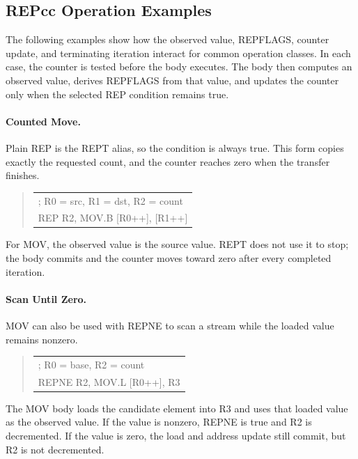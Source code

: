 \subsection{REPcc Operation Examples}
The following examples show how the observed value, REPFLAGS, counter update, and terminating iteration interact
for common operation classes. In each case, the counter is tested before the body executes. The body then
computes an observed value, derives REPFLAGS from that value, and updates the counter only when the selected REP
condition remains true.

\paragraph{Counted Move.}
Plain REP is the REPT alias, so the condition is always true. This form copies exactly the requested count, and
the counter reaches zero when the transfer finishes.

\begin{quote}
\begingroup\small\ttfamily
\begin{tabular}{@{}l@{}}
; R0 = src, R1 = dst, R2 = count\\
REP R2, MOV.B [R0++], [R1++]\\
\end{tabular}
\endgroup
\end{quote}

For MOV, the observed value is the source value. REPT does not use it to stop; the body commits and the counter
moves toward zero after every completed iteration.

\paragraph{Scan Until Zero.}
MOV can also be used with REPNE to scan a stream while the loaded value remains nonzero.

\begin{quote}
\begingroup\small\ttfamily
\begin{tabular}{@{}l@{}}
; R0 = base, R2 = count\\
REPNE R2, MOV.L [R0++], R3\\
\end{tabular}
\endgroup
\end{quote}

The MOV body loads the candidate element into R3 and uses that loaded value as the observed value. If the value
is nonzero, REPNE is true and R2 is decremented. If the value is zero, the load and address update still commit,
but R2 is not decremented.

